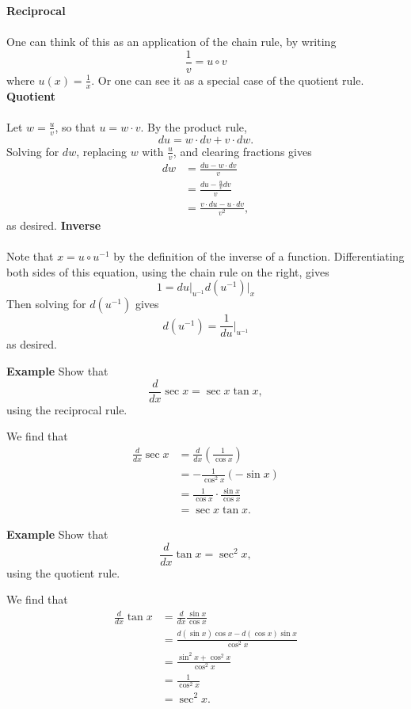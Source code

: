 \documentclass[twoside,openright,titlepage,a4paper]{book}
\begin{document}
\begin{sloppypar}
\begin{examplebox}
\textbf{Reciprocal}\\\\
One can think of this as an application of the chain rule, by writing \[ \frac{1}{v} = u \circ v \] where $u(x) = \frac{1}{x}$. Or one can see it as a special case of the quotient rule.
\bigbreak
\textbf{Quotient}\\\\
Let $w = \frac{u}{v}$, so that $u = w \cdot v$. By the product rule, \[ du = w \cdot dv + v \cdot dw. \]
Solving for $dw$, replacing $w$ with $\frac{u}{v}$, and clearing fractions gives
\begin{align*}
dw &= \frac{du - w \cdot dv}{v} \\
&= \frac{du - \frac{u}{v} dv}{v} \\
&= \frac{v \cdot du - u \cdot dv}{v^2},
\end{align*}
as desired.
\bigbreak
\textbf{Inverse}\\\\
Note that $x = u \circ u^{-1}$ by the definition of the inverse of a function. Differentiating both sides of this equation, using the chain rule on the right, gives \[ 1 = du \bigg|_{u^{-1}} d(u^{-1}) \bigg|_{x} \]
Then solving for $d(u^{-1})$ gives \[ d(u^{-1}) = \frac{1}{du} \bigg|_{u^{-1}} \] as desired.
\end{examplebox}

\textbf{Example} Show that \[ \frac{d}{dx} \sec x = \sec x \tan x, \] using the reciprocal rule.
\begin{examplebox}
We find that
\begin{align*}
\frac{d}{dx} \sec x &= \frac{d}{dx}\left(\frac{1}{\cos x}\right) \\
&= -\frac{1}{\cos^2x} (-\sin x) \\
&= \frac{1}{\cos x} \cdot \frac{\sin x}{\cos x} \\
&= \sec x \tan x.
\end{align*}
\end{examplebox}

\textbf{Example} Show that \[ \frac{d}{dx} \tan x = \sec^2 x, \] using the quotient rule. 
\begin{examplebox}
We find that
\begin{align*}
\frac{d}{dx}\tan x &= \frac{d}{dx} \frac{\sin x}{\cos x} \\
&= \frac{d(\sin x)\cos x - d(\cos x)\sin x}{\cos^2 x} \\
&= \frac{\sin^2x + \cos^2x}{\cos^2x} \\
&= \frac{1}{\cos^2x} \\
&= \sec^2 x. 
\end{align*}
\end{examplebox}


\end{sloppypar}
\end{document}
